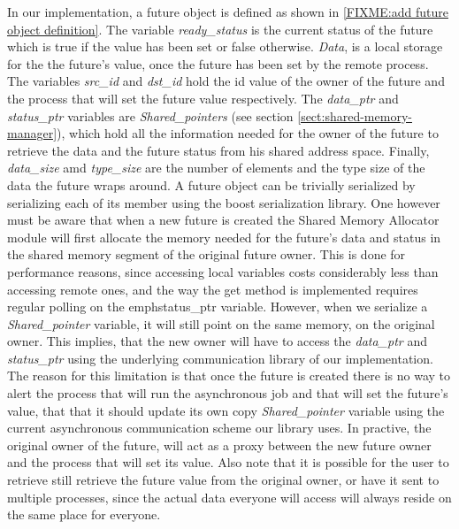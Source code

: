 In our implementation, a future object is defined as shown in \ref{FIXME:add future object definition}.
The variable \emph{ready\_status} is the current
status of the future which is true if the value has been set or false otherwise.  \emph{Data}, is a local storage for the
the future's value, once the future has been set by the remote process.  The variables \emph{src\_id} and \emph{dst\_id}
hold the id value of the owner of the future and the process that will set the future value respectively.  
The \emph{data\_ptr} and \emph{status\_ptr} variables are \emph{Shared\_pointers} (see section \ref{sect:shared-memory-manager}),
which hold all the
information needed for the owner of the future to retrieve the data and the future status from his shared address space. 
Finally, \emph{data\_size} amd \emph{type\_size} are the number of elements and the
type size of the data the future wraps around.  A future object can be trivially serialized by serializing each
of its member using the boost serialization library.  One however must be aware that when a new future is created
the Shared Memory Allocator module will first allocate the memory needed for the future's data and status in the 
shared memory segment of the original future owner.  This is done for performance reasons, since accessing local
variables costs considerably less than accessing remote ones, and the way the get method is implemented requires 
regular polling on the emph{status\_ptr} variable.  However, when we serialize a \emph{Shared\_pointer} variable,
it will still point on the same memory, on the original owner.  This implies, that the new owner will have to 
access the \emph{data\_ptr} and \emph{status\_ptr} using the underlying communication library of our implementation.
The reason for this limitation is that once the future is created there is no way to alert the process that will
run the asynchronous job and that will set the future's value, that that it should update its own copy \emph{Shared\_pointer}
variable using the current asynchronous communication scheme our library uses.  In practive, the original owner of the
future, will act as a proxy between the new future owner and the process that will set its value.  Also note that it is
possible for the user to retrieve still retrieve the future value from the original owner, or have it sent to multiple
processes, since the actual data everyone will access will always reside on the same place for everyone.
   

